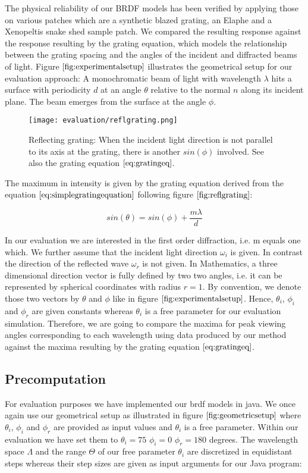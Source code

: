 The physical reliability of our BRDF models has been verified by applying those on various patches which are a synthetic blazed grating, an Elaphe and a Xenopeltis snake shed sample patch. We compared the resulting response against the response resulting by the grating equation, which models the relationship between the grating spacing and the angles of the incident and diffracted beams of light. Figure $\ref{fig:experimentalsetup}$ illustrates the geometrical setup for our evaluation approach: A monochromatic beam of light with wavelength $\lambda$ hits a surface with periodicity $d$ at an angle $\theta$ relative to the normal $n$ along its incident plane. The beam emerges from the surface at the angle $\phi$. 

\begin{figure}[H]
  \centering
  \texttt{[image: evaluation/reflgrating.png]}
  \caption{Reflecting grating: When the incident light direction is not parallel to its axis at the grating, there is another $sin(\phi)$ involved. See also the grating equation $\ref{eq:gratingeq}$.}
  \label{fig:reflgrating}
\end{figure}

The maximum in intensity is given by the grating equation derived from the equation $\ref{eq:simplegratingequation}$ following figure $\ref{fig:reflgrating}$: 

\begin{equation}
  sin(\theta) = sin(\phi) + \frac{m \lambda}{d}
\label{eq:gratingeq}
\end{equation}

In our evaluation we are interested in the first order diffraction, i.e. m equals one which. We further assume that the incident light direction $\omega_i$ is given. In contrast the direction of the reflected wave $\omega_r$ is not given.
In Mathematics, a three dimensional direction vector is fully defined by two two angles, i.e. it can be represented by spherical coordinates with radius $r = 1$. By convention, we denote those two vectors by $\theta$ and $\phi$ like in figure $\ref{fig:experimentalsetup}$. Hence, $\theta_i$, $\phi_i$ and $\phi_r$ are given constants whereas $\theta_i$ is a free parameter for our evaluation simulation. Therefore, we are going to compare the maxima for peak viewing angles corresponding to each wavelength using data produced by our method against the maxima resulting by the grating equation $\ref{eq:gratingeq}$.

\subsection{Precomputation}
For evaluation purposes we have implemented our brdf models in java. We once again use our geometrical setup as illustrated in figure $\ref{fig:geometricsetup}$ where $\theta_i$, $\phi_i$ and $\phi_r$ are provided as input values and $\theta_i$ is a free parameter. Within our evaluation we have set them to $\theta_i = 75$ $\phi_i = 0$ $\phi_r = 180$ degrees. The wavelength space $\Lambda$ and the range $\Theta$ of our free parameter $\theta_i$ are discretized in equidistant steps whereas their step sizes are given as input arguments for our Java program:

